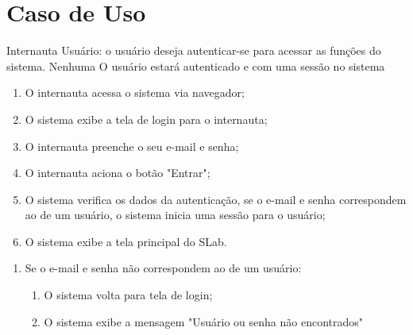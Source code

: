 \section{Caso de Uso}

{Internauta}
{Usuário: o usuário deseja autenticar-se para acessar as funções do sistema.}
{Nenhuma}
{O usuário estará autenticado e com uma sessão no sistema}
{
	\begin{enumerate}[label=FB\arabic*.]
		\item O internauta acessa o sistema via navegador;
		
		\item O sistema exibe a tela de login para o internauta;
		
		\item O internauta preenche o seu e-mail e senha;
		
		\item O internauta aciona o botão "Entrar";
		
		\item O sistema verifica os dados da autenticação,
		se o e-mail e senha correspondem ao de um usuário, 
		o sistema inicia uma sessão para o usuário;
		
		\item O sistema exibe a tela principal do SLab.
	\end{enumerate}
}{
	\begin{enumerate}[label=FA\arabic*.]
		\item Se o e-mail e senha não correspondem ao de um usuário:
			\begin{enumerate}
				\item O sistema volta para tela de login;
				
				\item O sistema exibe a mensagem "Usuário ou senha não encontrados"
			\end{enumerate}
	\end{enumerate}
}{}{}